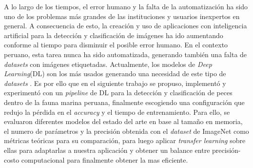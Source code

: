 A lo largo de los tiempos, el error humano y la falta de la automatización ha sido uno de los problemas más grandes de las instituciones y usuarios inexpertos en general. A consecuencia de esto, la creación y uso de aplicaciones con inteligencia artificial para la detección y clasificación de imágenes ha ido aumentando conforme al tiempo para disminuir el posible error humano. En el contexto peruano, esta tarea  nunca ha sido automatizada, generando también una falta de \textit{datasets} con imágenes etiquetadas. Actualmente, los modelos de \textit{Deep Learning}(DL) son los más usados generando una necesidad de este tipo de \textit{datasets} . Es por ello que en el siguiente trabajo se propuso, implementó y experimentó con un \textit{pipeline} de DL para la detección y clasificación de peces dentro de la fauna marina peruana, finalmente escogiendo una configuración que redujo la pérdida en el \textit{accuracy} y el tiempo de entrenamiento. Para ello, se evaluaron diferentes modelos del estado del arte en base al tamaño en memoria, el numero de parámetros y la precisión obtenida con el \textit{dataset} de ImageNet como métricas teóricas para su comparación, para luego aplicar \textit{transfer learning} sobre ellas para adaptarlas a nuestra aplicación y obtener un balance entre precisión-costo computacional para finalmente obtener la mas eficiente.  \\